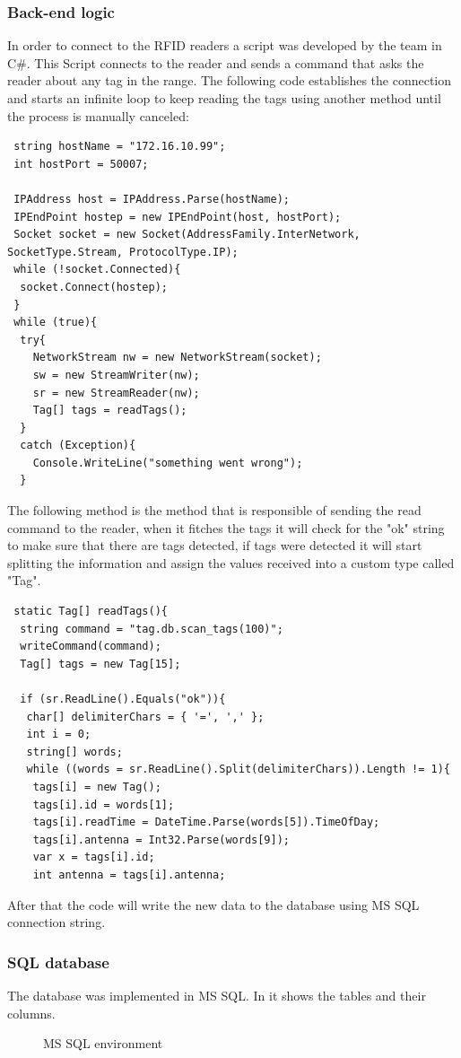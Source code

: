 \documentclass[a4paper,twoside]{IEEEtran}
\begin{document}
\subsubsection{Back-end logic}
In order to connect to the RFID readers a script was developed by the team in C\#. This Script connects to the reader and sends a command that asks the reader about any tag in the range. The following code establishes the connection and starts an infinite loop to keep reading the tags using another method until the process is manually canceled:
\lstset{style=sharpc}
\begin{lstlisting}
 string hostName = "172.16.10.99";
 int hostPort = 50007;

 IPAddress host = IPAddress.Parse(hostName);
 IPEndPoint hostep = new IPEndPoint(host, hostPort);
 Socket socket = new Socket(AddressFamily.InterNetwork, SocketType.Stream, ProtocolType.IP);
 while (!socket.Connected){
  socket.Connect(hostep);
 }
 while (true){
  try{
    NetworkStream nw = new NetworkStream(socket);
    sw = new StreamWriter(nw);
    sr = new StreamReader(nw);
    Tag[] tags = readTags();
  }
  catch (Exception){
    Console.WriteLine("something went wrong");
  }
\end{lstlisting}
The following method is the method that is responsible of sending the read command to the reader, when it fitches the tags it will check for the "ok" string to make sure that there are tags detected, if tags were detected it will start splitting the information and assign the values received into a custom type called "Tag".
\lstset{style=sharpc}
\begin{lstlisting}
 static Tag[] readTags(){ 
  string command = "tag.db.scan_tags(100)";
  writeCommand(command);
  Tag[] tags = new Tag[15];

  if (sr.ReadLine().Equals("ok")){
   char[] delimiterChars = { '=', ',' };
   int i = 0;
   string[] words;
   while ((words = sr.ReadLine().Split(delimiterChars)).Length != 1){
    tags[i] = new Tag();
    tags[i].id = words[1];
    tags[i].readTime = DateTime.Parse(words[5]).TimeOfDay;
    tags[i].antenna = Int32.Parse(words[9]);
    var x = tags[i].id;
    int antenna = tags[i].antenna;
\end{lstlisting}
After that the code will write the new data to the database using MS SQL connection string.

\subsubsection{SQL database} The database was implemented in MS SQL. In  it shows the tables and their columns.\\
\begin{figure}[ht]
\centering
{}
\caption{MS SQL environment}
\label{sql}
\end{figure}
\end{document}
